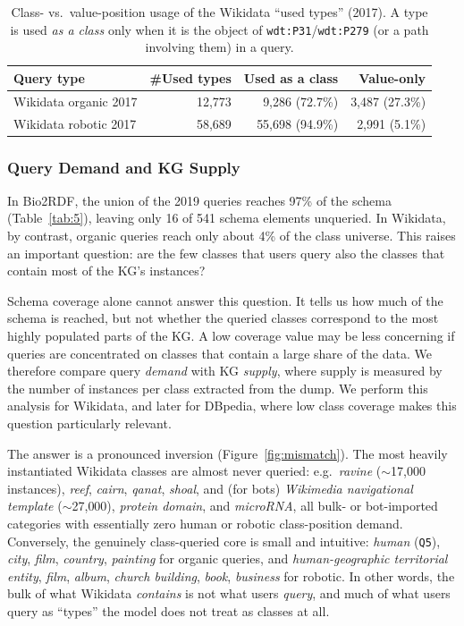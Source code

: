 \documentclass[sw]{iosart2x}
\begin{document}
\begin{table}[ht]
\centering
\caption{Class- vs.\ value-position usage of the Wikidata ``used types'' (2017). A type is used \emph{as a class} only when it is the object of \texttt{wdt:P31}/\texttt{wdt:P279} (or a path involving them) in a query.}
\label{tab:classvalue}
\begin{tabular}{l|r|r|r}
\hline
Query type & \#Used types & Used as a class & Value-only \\
\hline
Wikidata organic 2017 & 12,773 & 9,286 (72.7\%) & 3,487 (27.3\%) \\
Wikidata robotic 2017 & 58,689 & 55,698 (94.9\%) & 2,991 (5.1\%) \\
\hline
\end{tabular}
\end{table}

\subsubsection{Query Demand and KG Supply}
In Bio2RDF, the union of the 2019 queries reaches 97\% of the schema (Table~\ref{tab:5}), leaving only 16 of 541 schema elements unqueried. In Wikidata, by contrast, organic queries reach only about 4\% of the class universe. This raises an important question: are the few classes that users query also the classes that contain most of the KG's instances?

Schema coverage alone cannot answer this question. It tells us how much of the schema is reached, but not whether the queried classes correspond to the most highly populated parts of the KG. A low coverage value may be less concerning if queries are concentrated on classes that contain a large share of the data. We therefore compare query \emph{demand} with KG \emph{supply}, where supply is measured by the number of instances per class extracted from the dump. We perform this analysis for Wikidata, and later for DBpedia, where low class coverage makes this question particularly relevant.


The answer is a pronounced inversion (Figure~\ref{fig:mismatch}). The most heavily instantiated Wikidata classes are almost never queried: e.g.\ \emph{ravine} ($\sim$17{,}000 instances), \emph{reef}, \emph{cairn}, \emph{qanat}, \emph{shoal}, and (for bots) \emph{Wikimedia navigational template} ($\sim$27{,}000), \emph{protein domain}, and \emph{microRNA}, all bulk- or bot-imported categories with essentially zero human or robotic class-position demand. Conversely, the genuinely class-queried core is small and intuitive: \emph{human} (\texttt{Q5}), \emph{city}, \emph{film}, \emph{country}, \emph{painting} for organic queries, and \emph{human-geographic territorial entity}, \emph{film}, \emph{album}, \emph{church building}, \emph{book}, \emph{business} for robotic. In other words, the bulk of what Wikidata \emph{contains} is not what users \emph{query}, and much of what users query as ``types'' the model does not treat as classes at all.
\end{document}
